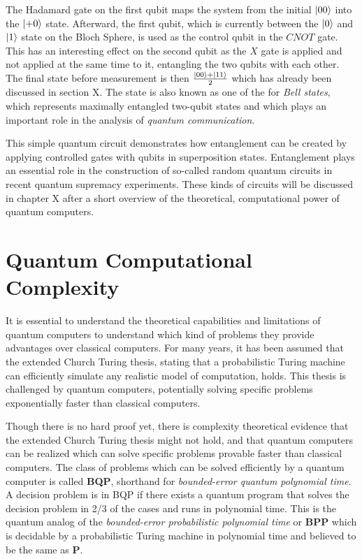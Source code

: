 The Hadamard gate on the first qubit maps the system from the initial $\Ket{00}$
into the $\Ket{+0}$ state. Afterward, the first qubit, which is currently
between the $\Ket{0}$ and $\Ket{1}$ state on the Bloch Sphere, is used as the
control qubit in the $CNOT$ gate. This has an interesting effect on the second qubit
as the $X$ gate is applied and not applied at the same time to it, entangling
the two qubits with each other. The final state before measurement is then
$\frac{\Ket{00} + \Ket{11}}{2}$ which has already been discussed in section X.
The state is also known as one of the for \textit{Bell states}, which represents maximally
entangled two-qubit states and which plays an important role in the analysis of
\textit{quantum communication}.

This simple quantum circuit demonstrates how entanglement can be created by applying controlled gates with qubits in superposition states.
Entanglement plays an essential role in the construction of so-called random
quantum circuits in recent quantum supremacy experiments. These kinds of circuits will
be discussed in chapter X after a short overview of the theoretical,
computational power of quantum computers.


\section{Quantum Computational Complexity}

It is essential to understand the theoretical capabilities and limitations of quantum computers to understand which kind of problems
they provide advantages over classical computers. For many years, it has been
assumed that the extended Church Turing thesis, stating that a probabilistic
Turing machine can efficiently simulate any realistic model of computation,
holds. This thesis is challenged by quantum computers, potentially solving specific problems exponentially faster than classical computers.

Though there is no hard proof yet, there is complexity theoretical evidence that the
extended Church Turing thesis might not hold, and that quantum computers can be
realized which can solve specific problems provable faster than classical
computers. The class of problems which can be solved efficiently by a quantum
computer is called \textbf{BQP}, shorthand for \textit{bounded-error quantum
  polynomial time}. A decision problem is in BQP if there exists a quantum
program that solves the decision problem in 2/3 of the cases and runs in
polynomial time. This is the quantum analog of the \textit{bounded-error
  probabilistic polynomial time} or \textbf{BPP} which is decidable by a
probabilistic Turing machine in polynomial time and believed to be the same as
\textbf{P}.

